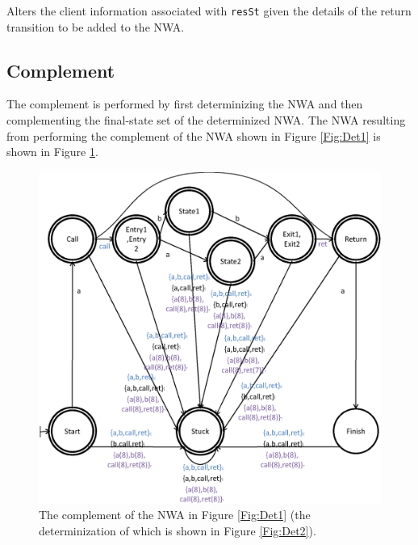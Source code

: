 \documentclass{llncs}
\begin{document}
\begin{description}
    Alters the client information associated with \texttt{resSt} given the details of the return transition to be added to the NWA. \\

\end{description}




\subsection{Complement}
\label{Se:Complement}

The complement is performed by first determinizing the NWA and then complementing the final-state set of the determinized NWA.  The NWA resulting from performing the complement of the NWA shown in Figure \ref{Fig:Det1} is shown in Figure \ref{Fig:Comp1}.

\begin{figure}[p]
  \centering
    \includegraphics[width=12cm]{Figures/Figure20.eps}
  \caption{The complement of the NWA in Figure \ref{Fig:Det1} (the determinization of which is shown in Figure \ref{Fig:Det2}).}
  \label{Fig:Comp1}
\end{figure}
\end{document}
